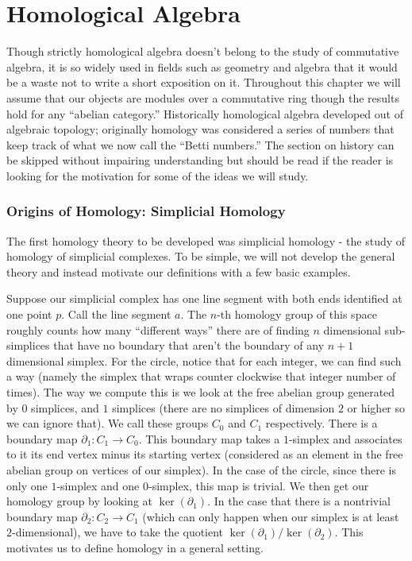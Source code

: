 \usepackage{amscd}
\chapter{Homological Algebra} 

Though strictly homological algebra doesn't
belong to the study of commutative algebra, it is so widely used in fields
such as geometry and algebra that it would be a waste not to write a short
exposition on it. Throughout this chapter we will assume that our objects are
modules over a commutative ring though the results hold for any ``abelian
category.'' Historically homological algebra developed out of algebraic
topology; originally homology was considered a series of numbers that keep
track of what we now call the ``Betti numbers.'' The section on history can
be skipped without impairing understanding but should be read if the reader
is looking for the motivation for some of the ideas we will study.

\subsection{Origins of Homology: Simplicial Homology}

The first homology theory
to be developed was simplicial homology - the study of homology of simplicial
complexes. To be simple, we will not develop the general theory and instead
motivate our definitions with a few basic examples.  

\begin{example} Suppose
our simplicial complex has one line segment with both ends identified at
one point $p$. Call the line segment $a$. The $n$-th homology group of this
space roughly counts how many ``different ways'' there are of finding $n$
dimensional sub-simplices that have no boundary that aren't the boundary of
any $n+1$ dimensional simplex. For the circle, notice that for each integer,
we can find such a way (namely the simplex that wraps counter clockwise that
integer number of times). The way we compute this is we look at the free abelian group generated by $0$ simplices, and $1$ simplices (there are no simplices of
dimension $2$ or higher so we can ignore that). We call these groups $C_0$ and
$C_1$ respectively. There is a boundary map $\partial_1: C_1\rightarrow C_0$.
This boundary map takes a $1$-simplex and associates to it its end vertex minus
its starting vertex (considered as an element in the free abelian group on
vertices of our simplex). In the case of the circle, since there is only one
$1$-simplex and one $0$-simplex, this map is trivial. We then get our homology
group by looking at $\ker(\partial_1)$. In the case that there is a nontrivial
boundary map $\partial_2: C_2\rightarrow C_1$ (which can only happen when our
simplex is at least $2$-dimensional), we have to take the quotient
$\ker(\partial_1)/\ker(\partial_2)$. This motivates us to define homology in a
general setting.
\end{example}

